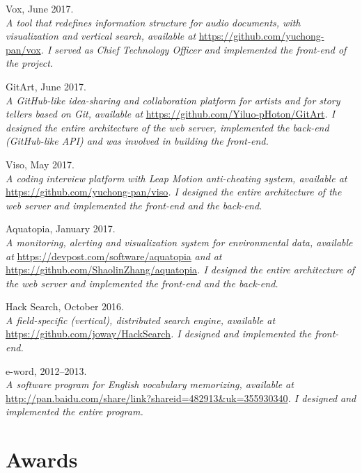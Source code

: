 \documentclass[letterpaper]{article}
\renewenvironment{itemize}{
  \begin{list}{}{
    \setlength{\leftmargin}{1.5em}
  }
}{
  \end{list}
}
\begin{document}
\begin{itemize}
  \item Vox, June 2017.\\
  \emph{A tool that redefines information structure for audio documents, with visualization and vertical search, available at }\url{https://github.com/yuchong-pan/vox}\emph{. I served as Chief Technology Officer and implemented the front-end of the project.}

  \item GitArt, June 2017.\\
  \emph{A GitHub-like idea-sharing and collaboration platform for artists and for story tellers based on Git, available at }\url{https://github.com/Yiluo-pHoton/GitArt}\emph{. I designed the entire architecture of the web server, implemented the back-end (GitHub-like API) and was involved in building the front-end.}

  \item Viso, May 2017.\\
  \emph{A coding interview platform with Leap Motion anti-cheating system, available at }\url{https://github.com/yuchong-pan/viso}\emph{. I designed the entire architecture of the web server and implemented the front-end and the back-end.}

  \item Aquatopia, January 2017.\\
  \emph{A monitoring, alerting and visualization system for environmental data, available at }\url{https://devpost.com/software/aquatopia}\emph{ and at }\url{https://github.com/ShaolinZhang/aquatopia}\emph{. I designed the entire architecture of the web server and implemented the front-end and the back-end.}

  \item Hack Search, October 2016.\\
  \emph{A field-specific (vertical), distributed search engine, available at }\url{https://github.com/joway/HackSearch}\emph{. I designed and implemented the front-end.}

  \item e-word, 2012--2013.\\
  \emph{A software program for English vocabulary memorizing, available at }\url{http://pan.baidu.com/share/link?shareid=482913&uk=355930340}\emph{. I designed and implemented the entire program.}

\end{itemize}


\section*{Awards}
\end{document}
